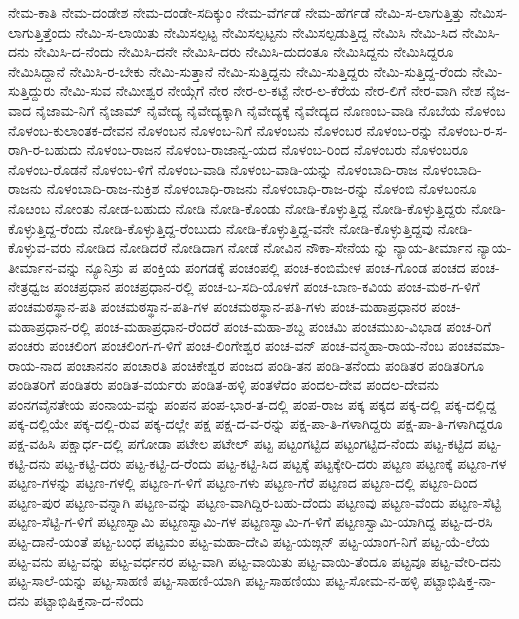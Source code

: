 {ನೇಮ-ಕಾತಿ
ನೇಮ-ದಂಡೇಶ
ನೇಮ-ದಂಡೇ-ಸದಿಕ್ಕುಂ
ನೇಮ-ವೆರ್ಗಡೆ
ನೇಮ-ಹೆರ್ಗಡೆ
ನೇಮಿ-ಸ-ಲಾಗುತ್ತಿತ್ತು
ನೇಮಿಸ-ಲಾಗುತ್ತಿತ್ತೆಂದು
ನೇಮಿ-ಸ-ಲಾಯಿತು
ನೇಮಿಸಲ್ಪಟ್ಟ
ನೇಮಿಸಲ್ಪಟ್ಟನು
ನೇಮಿಸಲ್ಪಡುತ್ತಿದ್ದ
ನೇಮಿಸಿ
ನೇಮಿ-ಸಿದ
ನೇಮಿಸಿ-ದನು
ನೇಮಿಸಿ-ದ-ನೆಂದು
ನೇಮಿಸಿ-ದನೇ
ನೇಮಿಸಿ-ದರು
ನೇಮಿಸಿ-ದುದಂತೂ
ನೇಮಿಸಿದ್ದನು
ನೇಮಿಸಿದ್ದರೂ
ನೇಮಿಸಿದ್ದಾನೆ
ನೇಮಿಸಿ-ರ-ಬೇಕು
ನೇಮಿ-ಸುತ್ತಾನೆ
ನೇಮಿ-ಸುತ್ತಿದ್ದನು
ನೇಮಿ-ಸುತ್ತಿದ್ದರು
ನೇಮಿ-ಸುತ್ತಿದ್ದ-ರೆಂದು
ನೇಮಿ-ಸುತ್ತಿದ್ದುರು
ನೇಮಿ-ಸುವ
ನೇಮೀಶ್ವರ
ನೇಯ್ಗೆಗೆ
ನೇರ
ನೇರ-ಲ-ಕಟ್ಟೆ
ನೇರ-ಲ-ಕೆರೆಯ
ನೇರ-ಲಿಗೆ
ನೇರ-ವಾಗಿ
ನೇಶ
ನೈಜ-ವಾದ
ನೈಜಾಮ-ನಿಗೆ
ನೈಜಾಮ್
ನೈವೇದ್ಯ
ನೈವೇದ್ಯಕ್ಕಾಗಿ
ನೈವೇದ್ಯಕ್ಕೆ
ನೈವೇದ್ಯದ
ನೊಣಂಬ-ವಾಡಿ
ನೊಬೆಯ
ನೊಳಂಬ
ನೊಳಂಬ-ಕುಲಾಂತಕ-ದೇವನ
ನೊಳಂಬನ
ನೊಳಂಬ-ನಿಗೆ
ನೊಳಂಬನು
ನೊಳಂಬರ
ನೊಳಂಬ-ರನ್ನು
ನೊಳಂಬ-ರ-ಸ-ರಾಗಿ-ರ-ಬಹುದು
ನೊಳಂಬ-ರಾಜನ
ನೊಳಂಬ-ರಾಜಾನ್ವ-ಯದ
ನೊಳಂಬ-ರಿಂದ
ನೊಳಂಬರು
ನೊಳಂಬರೂ
ನೊಳಂಬ-ರೊಡನೆ
ನೊಳಂಬ-ಳಿಗೆ
ನೊಳಂಬ-ವಾಡಿ
ನೊಳಂಬ-ವಾಡಿ-ಯನ್ನು
ನೊಳಂಬಾದಿ-ರಾಜ
ನೊಳಂಬಾದಿ-ರಾಜನು
ನೊಳಂಬಾದಿ-ರಾಜ-ನುಕ್ರಿಶ
ನೊಳಂಬಾಧಿ-ರಾಜನು
ನೊಳಂಬಾಧಿ-ರಾಜ-ರನ್ನು
ನೊಳಂಬಿ
ನೊಳಬಂನೂ
ನೊೞಂಬ
ನೋಂತು
ನೋಡ-ಬಹುದು
ನೋಡಿ
ನೋಡಿ-ಕೊಂಡು
ನೋಡಿ-ಕೊಳ್ಳುತ್ತಿದ್ದ
ನೋಡಿ-ಕೊಳ್ಳುತ್ತಿದ್ದರು
ನೋಡಿ-ಕೊಳ್ಳುತ್ತಿದ್ದ-ರೆಂದು
ನೋಡಿ-ಕೊಳ್ಳುತ್ತಿದ್ದ-ರೆಂಬುದು
ನೋಡಿ-ಕೊಳ್ಳುತ್ತಿದ್ದ-ವನೇ
ನೋಡಿ-ಕೊಳ್ಳುತ್ತಿದ್ದವು
ನೋಡಿ-ಕೊಳ್ಳುವ-ವರು
ನೋಡಿದ
ನೋಡಿದರೆ
ನೋಡಿದಾಗ
ನೋಡೆ
ನೋವಿನ
ನೌಕಾ-ಸೇನೆಯ
ನ್ನು
ನ್ಯಾಯ-ತೀರ್ಮಾನ
ನ್ಯಾಯ-ತೀರ್ಮಾನ-ವನ್ನು
ನ್ಯೂನಿಸ್ರು
ಪ
ಪಂಕ್ತಿಯ
ಪಂಗಡಕ್ಕೆ
ಪಂಚಂಪಲ್ಲಿ
ಪಂಚ-ಕಂಬಿಮೇಳ
ಪಂಚ-ಗೊಂಡ
ಪಂಚದ
ಪಂಚ-ನೇತ್ರಧ್ವಜ
ಪಂಚಪ್ರಧಾನ
ಪಂಚಪ್ರಧಾನ-ರಲ್ಲಿ
ಪಂಚ-ಬ-ಸದಿ-ಯೊಳಗೆ
ಪಂಚ-ಬಾಣ-ಕವಿಯ
ಪಂಚ-ಮಠ-ಗ-ಳಿಗೆ
ಪಂಚಮಠಸ್ಥಾನ-ಪತಿ
ಪಂಚಮಠಸ್ಥಾನ-ಪತಿ-ಗಳ
ಪಂಚಮಠಸ್ಥಾನ-ಪತಿ-ಗಳು
ಪಂಚ-ಮಹಾಪ್ರಧಾನರ
ಪಂಚ-ಮಹಾಪ್ರಧಾನ-ರಲ್ಲಿ
ಪಂಚ-ಮಹಾಪ್ರಧಾನ-ರೆಂದರೆ
ಪಂಚ-ಮಹಾ-ಶಬ್ದ
ಪಂಚಮಿ
ಪಂಚಮುಖ-ವಿಭಾಡ
ಪಂಚ-ರಿಗೆ
ಪಂಚರು
ಪಂಚಲಿಂಗ
ಪಂಚಲಿಂಗ-ಗ-ಳಿಗೆ
ಪಂಚ-ಲಿಂಗೇಶ್ವರ
ಪಂಚ-ವನ್
ಪಂಚ-ವನ್ಮಹಾ-ರಾಯ-ನೆಂಬ
ಪಂಚವಮಾ-ರಾಯ-ನಾದ
ಪಂಚಾನನಂ
ಪಂಚಾರತಿ
ಪಂಚಿಕೇಶ್ವರ
ಪಂಜದ
ಪಂಡಿ-ತನ
ಪಂಡಿ-ತನೆಂದು
ಪಂಡಿತರ
ಪಂಡಿತರಿಗೂ
ಪಂಡಿತರಿಗೆ
ಪಂಡಿತರು
ಪಂಡಿತ-ವರ್ಯರು
ಪಂಡಿತ-ಹಳ್ಳಿ
ಪಂತಳೆದಂ
ಪಂದಲ-ದೇವ
ಪಂದಲ-ದೇವನು
ಪಂನಗವೈನತೇಯ
ಪಂನಾಯ-ವನ್ನು
ಪಂಪನ
ಪಂಪ-ಭಾರ-ತ-ದಲ್ಲಿ
ಪಂಪ-ರಾಜ
ಪಕ್ಕ
ಪಕ್ಕದ
ಪಕ್ಕ-ದಲ್ಲಿ
ಪಕ್ಕ-ದಲ್ಲಿದ್ದ
ಪಕ್ಕ-ದಲ್ಲಿಯೇ
ಪಕ್ಕ-ದಲ್ಲಿ-ರುವ
ಪಕ್ಕ-ದಲ್ಲೇ
ಪಕ್ಷ
ಪಕ್ಷ-ದ-ವ-ರನ್ನು
ಪಕ್ಷ-ಪಾ-ತಿ-ಗಳಾಗಿದ್ದರು
ಪಕ್ಷ-ಪಾ-ತಿ-ಗಳಾಗಿದ್ದರೂ
ಪಕ್ಷ-ವಹಿಸಿ
ಪಕ್ಷಾರ್ಧ-ದಲ್ಲಿ
ಪಗೋಡಾ
ಪಟೇಲ
ಪಟೇಲ್
ಪಟ್ಟ
ಪಟ್ಟಂಗಟ್ಟಿದ
ಪಟ್ಟಂಗಟ್ಟಿದ-ನೆಂದು
ಪಟ್ಟ-ಕಟ್ಟಿದ
ಪಟ್ಟ-ಕಟ್ಟಿ-ದನು
ಪಟ್ಟ-ಕಟ್ಟಿ-ದರು
ಪಟ್ಟ-ಕಟ್ಟಿ-ದ-ರೆಂದು
ಪಟ್ಟ-ಕಟ್ಟಿ-ಸಿದ
ಪಟ್ಟಕ್ಕೆ
ಪಟ್ಟಕ್ಕೇರಿ-ದರು
ಪಟ್ಟಣ
ಪಟ್ಟಣಕ್ಕೆ
ಪಟ್ಟಣ-ಗಳ
ಪಟ್ಟಣ-ಗಳನ್ನು
ಪಟ್ಟಣ-ಗಳಲ್ಲಿ
ಪಟ್ಟಣ-ಗ-ಳಿಗೆ
ಪಟ್ಟಣ-ಗಳು
ಪಟ್ಟಣ-ಗೆರೆ
ಪಟ್ಟಣದ
ಪಟ್ಟಣ-ದಲ್ಲಿ
ಪಟ್ಟಣ-ದಿಂದ
ಪಟ್ಟಣ-ಪುರ
ಪಟ್ಟಣ-ವನ್ನಾಗಿ
ಪಟ್ಟಣ-ವನ್ನು
ಪಟ್ಟಣ-ವಾಗಿದ್ದಿರ-ಬಹು-ದೆಂದು
ಪಟ್ಟಣವು
ಪಟ್ಟಣ-ವೆಂದು
ಪಟ್ಟಣ-ಸೆಟ್ಟಿ
ಪಟ್ಟಣ-ಸೆಟ್ಟಿ-ಗ-ಳಿಗೆ
ಪಟ್ಟಣಸ್ವಾಮಿ
ಪಟ್ಟಣಸ್ವಾಮಿ-ಗಳ
ಪಟ್ಟಣಸ್ವಾಮಿ-ಗ-ಳಿಗೆ
ಪಟ್ಟಣಸ್ವಾಮಿ-ಯಾಗಿದ್ದ
ಪಟ್ಟ-ದ-ರಸಿ
ಪಟ್ಟ-ದಾನೆ-ಯಂತೆ
ಪಟ್ಟ-ಬಂಧ
ಪಟ್ಟಮಂ
ಪಟ್ಟ-ಮಹಾ-ದೇವಿ
ಪಟ್ಟ-ಯಙ್ಗನ್
ಪಟ್ಟ-ಯಾಂಗ-ನಿಗೆ
ಪಟ್ಟ-ಯೆ-ಲೆಯ
ಪಟ್ಟ-ವನು
ಪಟ್ಟ-ವನ್ನು
ಪಟ್ಟ-ವರ್ಧನರ
ಪಟ್ಟ-ವಾಗಿ
ಪಟ್ಟ-ವಾಯಿತು
ಪಟ್ಟ-ವಾಯಿ-ತೆಂದೂ
ಪಟ್ಟವೂ
ಪಟ್ಟ-ವೇರಿ-ದನು
ಪಟ್ಟ-ಸಾಲೆ-ಯನ್ನು
ಪಟ್ಟ-ಸಾಹಣಿ
ಪಟ್ಟ-ಸಾಹಣಿ-ಯಾಗಿ
ಪಟ್ಟ-ಸಾಹಣಿಯು
ಪಟ್ಟ-ಸೋಮ-ನ-ಹಳ್ಳಿ
ಪಟ್ಟಾಭಿಷಿಕ್ತ-ನಾ-ದನು
ಪಟ್ಟಾಭಿಷಿಕ್ತನಾ-ದ-ನೆಂದು
}
